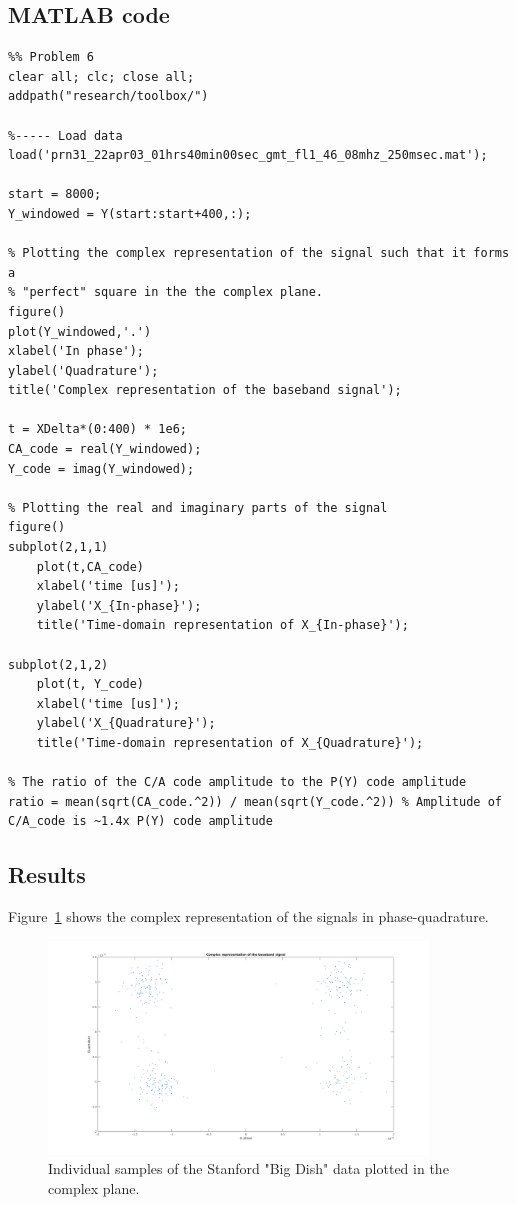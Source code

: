 \subsection{MATLAB code}

\begin{lstlisting}
%% Problem 6
clear all; clc; close all;
addpath("research/toolbox/")

%----- Load data
load('prn31_22apr03_01hrs40min00sec_gmt_fl1_46_08mhz_250msec.mat');

start = 8000;
Y_windowed = Y(start:start+400,:);

% Plotting the complex representation of the signal such that it forms a
% "perfect" square in the the complex plane.
figure()
plot(Y_windowed,'.')
xlabel('In phase');
ylabel('Quadrature');
title('Complex representation of the baseband signal');

t = XDelta*(0:400) * 1e6;
CA_code = real(Y_windowed);
Y_code = imag(Y_windowed);

% Plotting the real and imaginary parts of the signal
figure()
subplot(2,1,1)
    plot(t,CA_code)
    xlabel('time [us]');
    ylabel('X_{In-phase}');
    title('Time-domain representation of X_{In-phase}');

subplot(2,1,2)
    plot(t, Y_code)
    xlabel('time [us]');
    ylabel('X_{Quadrature}');
    title('Time-domain representation of X_{Quadrature}');

% The ratio of the C/A code amplitude to the P(Y) code amplitude
ratio = mean(sqrt(CA_code.^2)) / mean(sqrt(Y_code.^2)) % Amplitude of C/A_code is ~1.4x P(Y) code amplitude 
\end{lstlisting}

\subsection{Results}

Figure~\ref{fig:ex7_quadrature} shows the complex representation of the signals
in phase-quadrature.

\begin{figure}[H]
	\centering
	\includegraphics[width=0.9\textwidth]{figs/ex7_quadrature.png}
	\caption{Individual samples of the Stanford "Big Dish" data plotted in the
		complex plane.}
	\label{fig:ex7_quadrature}
\end{figure}

